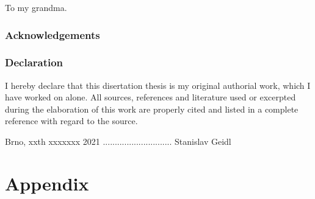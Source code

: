 \documentclass[12pt,a4paper,oneside,final]{book}
\begin{document}
\normalsize
\clearpage
\begin{center}
\vspace*{10cm}
To my grandma.
\end{center}

\normalsize

\clearpage
\pagestyle{plain}
\vspace*{18cm}
\section*{Acknowledgements}

\clearpage
\vspace*{18cm}
\section*{Declaration}
I hereby declare that this disertation thesis is my original authorial work,
which I have worked on alone. All sources, references and literature used or
excerpted during the elaboration of this work are properly cited and listed
in a complete reference with regard to the source.

Brno, xxth xxxxxxx 2021 ............................. Stanislav Geidl


\clearpage
\tableofcontents

\clearpage
{}


\renewcommand{\thesubfigure}{\Alph{subfigure}} %
\captionsetup[figure]{labelfont=bf} 
\captionsetup[subfigure]{labelfont=bf,labelformat=simple} %
\captionsetup[table]{labelfont=bf}
\captionsetup[subtable]{labelfont=bf}







\appendix
\setcounter{tocdepth}{3}
\setcounter{secnumdepth}{-1}

\part*{Appendix}

{\footnotesize

}




\end{document}
